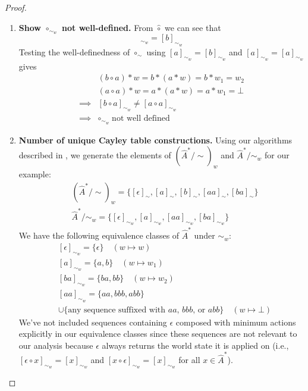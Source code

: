 \begin{proof}
\begin{enumerate}[(1)]
    \item \textbf{Show $\circ_{\sim_{w}}$ not well-defined.}
    From $\hat{\circ}$ we can see that
    \begin{equation}
        [a]_{\sim_{w}} = [b]_{\sim_{w}}
    \end{equation}
    Testing the well-definedness of $\circ_{\sim}$ using $[a]_{\sim_{w}} = [b]_{\sim_{w}}$ and $[a]_{\sim_{w}} = [a]_{\sim_{w}}$ gives
    \begin{align}
        & (b \circ a) \ast w = b \ast (a \ast w) = b \ast w_{1} = w_{2} \\
        & (a \circ a) \ast w = a \ast (a \ast w) = a \ast w_{1} = \bot \\
        \implies & [b \circ a]_{\sim_{w}} \neq [a \circ a]_{\sim_{w}} \\
        \implies & \circ_{\sim_{w}} \; \text{not well defined}
    \end{align}

    \item \textbf{Number of unique Cayley table constructions.}
    Using our algorithms described in , we generate the elements of $(\hat{A}^{*}/\sim)_{w}$ and $\hat{A}^{*}/\sim_{w}$ for our example:
    \begin{align}
        & (\hat{A}^{*}/\sim)_{w} = \{ [\epsilon]_{\sim}, [a]_{\sim}, [b]_{\sim}, [aa]_{\sim}, [ba]_{\sim} \} \\
        & \hat{A}^{*}/\sim_{w} = \{ [\epsilon]_{\sim_{w}}, [a]_{\sim_{w}}, [aa]_{\sim_{w}}, [ba]_{\sim_{w}} \}
    \end{align}
    We have the following equivalence classes of $\hat{A}^{*}$ under $\sim_{w}$:
    \begin{align}
        & [\epsilon]_{\sim_{w}} = \{ \epsilon \} \quad (w \mapsto w) \\
        & [a]_{\sim_{w}} = \{ a, b \} \quad (w \mapsto w_{1}) \\
        & [ba]_{\sim_{w}} = \{ ba, bb \} \quad (w \mapsto w_{2}) \\
        & [aa]_{\sim_{w}} = \{ aa, bbb, abb \} \\
        & \cup \{ \text{any sequence suffixed with $aa$, $bbb$, or $abb$} \} \quad (w \mapsto \bot)
    \end{align}
    We've not included sequences containing $\epsilon$ composed with minimum actions explicitly in our equivalence classes since these sequences are not relevant to our analysis because $\epsilon$ always returns the world state it is applied on (i.e., $[\epsilon \circ x]_{\sim_{w}} = [x]_{\sim_{w}}$ and $[x \circ \epsilon]_{\sim_{w}} = [x]_{\sim_{w}}$ for all $x \in \hat{A}^{*}$).


\end{enumerate}
\end{proof}
